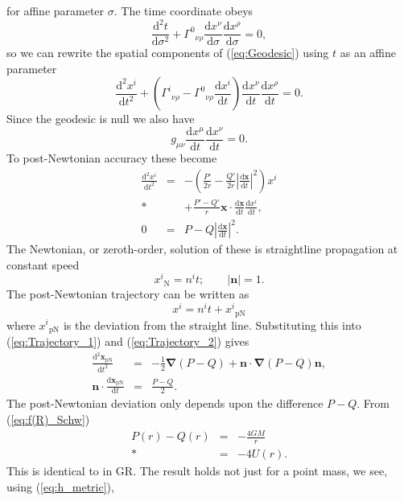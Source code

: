 \documentclass[aps,prd,amsfonts,amssymb,amsmath,nofootinbib,reprint,showpacs]{revtex4-1}
\newcommand{\eqnref}[1]{(\ref{eq:#1})}
\newcommand{\sub}[1]{\ensuremath{_\text{#1}}}
\newcommand{\dd}{\ensuremath{\text{d}}}
\newcommand{\diff}[2]{\ensuremath{\frac{\dd {#1}}{\dd {#2}}}}
\newcommand{\difftwo}[2]{\ensuremath{\frac{\dd^2 {#1}}{\dd {#2}^2}}}
\newcommand{\recip}[1]{\ensuremath{\frac{1}{#1}}}
\newcommand{\grad}{\ensuremath{\boldsymbol{\nabla}}}
\begin{document}
for affine parameter $\sigma$. The time coordinate obeys
\begin{equation}
\difftwo{t}{\sigma} + {\Gamma^0}_{\nu\rho}\diff{x^\nu}{\sigma}\diff{x^\rho}{\sigma} = 0,
\end{equation}
so we can rewrite the spatial components of \eqnref{Geodesic} using $t$ as an affine parameter~\cite{Will1993}
\begin{equation}
\difftwo{x^i}{t} + \left({\Gamma^i}_{\nu\rho} - {\Gamma^0}_{\nu\rho}\diff{x^i}{t}\right)\diff{x^\nu}{t}\diff{x^\rho}{t} = 0.
\end{equation}
Since the geodesic is null we also have
\begin{equation}
g_{\mu\nu}\diff{x^\mu}{t}\diff{x^\nu}{t} = 0.
\end{equation}
To post-Newtonian accuracy these become
\begin{eqnarray}
\label{eq:Trajectory_1}
\difftwo{x^i}{t} & = & -\left(\frac{P'}{2r} - \frac{Q'}{2r}\left|\diff{\boldsymbol{x}}{t}\right|^2\right)x^i \nonumber \\* 
 & & + {} \frac{P' - Q'}{r}\boldsymbol{x}\cdot\diff{\boldsymbol{x}}{t}\diff{x^i}{t}, \\
0 & = & P - Q\left|\diff{\boldsymbol{x}}{t}\right|^2.
\label{eq:Trajectory_2}
\end{eqnarray}
The Newtonian, or zeroth-order, solution of these is straightline propagation at constant speed~\cite{Will1993}
\begin{equation}
x^i\sub{N} = n^it; \qquad |\boldsymbol{n}| = 1.
\end{equation}
The post-Newtonian trajectory can be written as
\begin{equation}
x^i = n^it + x^i\sub{pN}
\end{equation}
where $x^i\sub{pN}$ is the deviation from the straight line. Substituting this into \eqnref{Trajectory_1} and \eqnref{Trajectory_2} gives
\begin{eqnarray}
\difftwo{\boldsymbol{x}\sub{pN}}{t} & = & -\recip{2}\grad(P - Q) + \boldsymbol{n}\cdot\grad(P - Q)\boldsymbol{n}, \\
\boldsymbol{n}\cdot\diff{\boldsymbol{x}\sub{pN}}{t} & = & \frac{P - Q}{2}.
\end{eqnarray}
The post-Newtonian deviation only depends upon the difference $P - Q$. From \eqnref{f(R)_Schw}
\begin{eqnarray}
P(r) - Q(r) & = & -\frac{4GM}{r} \nonumber \\*
 & = & -4U(r).
\end{eqnarray}
This is identical to in GR. The result holds not just for a point mass, we see, using \eqnref{h_metric},
\end{document}
